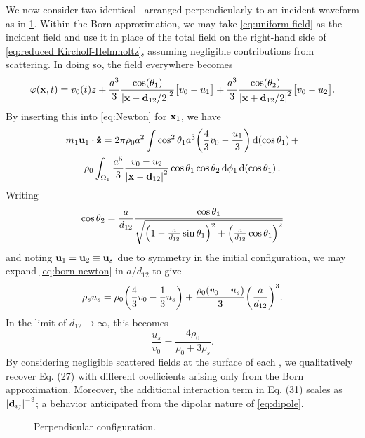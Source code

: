 We now consider two identical \bubbles\ arranged perpendicularly to an incident waveform as in \cref{fig:perpendicular}.
Within the Born approximation, we may take \cref{eq:uniform field} as the incident field and use it in place of the total field on the right-hand side of \cref{eq:reduced Kirchoff-Helmholtz}, assuming negligible contributions from scattering. In doing so, the field everywhere becomes
\begin{equation}
  \varphi(\vb{x}, t) = v_0(t) z + \frac{a^3}{3} \frac{\cos(\theta_1)}{\abs{\vb{x} - \vb{d}_{12}/2}^2}\qty\big[v_0 - u_1]
                                + \frac{a^3}{3} \frac{\cos(\theta_2)}{\abs{\vb{x} + \vb{d}_{12}/2}^2}\qty\big[v_0 - u_2].
\end{equation}
By inserting this into \cref{eq:Newton} for $\vb{x}_1$, we have
\begin{equation}
  \label{eq:born newton}
  \begin{gathered}
  m_1 \vb{u}_1 \cdot \vu{z} = 2 \pi \rho_0 a^2 \int \cos^2\theta_1 a^3 \qty(\frac{4}{3}v_0 - \frac{u_1}{3}) \dd{\qty(\cos\theta_1)} + \\
    \rho_0 \int_{\Omega_1} \frac{a^5}{3} \frac{v_0 - u_2}{\abs{\vb{x} - \vb{d}_{12}}^2} \cos\theta_1 \cos\theta_2 \dd{\phi_1} \dd{\qty(\cos \theta_1)}.
  \end{gathered}
\end{equation}
Writing
\begin{equation}
  \cos\theta_2 = \frac{a}{d_{12}} \frac{\cos\theta_1}{\sqrt{\qty(1 - \frac{a}{d_{12}}\sin\theta_1)^2 + \qty(\frac{a}{d_{12}}\cos\theta_1)^2}}
\end{equation}
and noting $\vb{u}_1 = \vb{u}_2 \equiv \vb{u}_s$ due to symmetry in the initial configuration, we may expand \cref{eq:born newton} in $a/d_{12}$ to give
\begin{equation}
  \label{eq:two bubble born}
  \rho_s u_s = \rho_0\qty(\frac{4}{3}v_0 - \frac{1}{3}u_s) + \frac{\rho_0\qty(v_0 - u_s)}{3}\qty(\frac{a}{d_{12}})^3.
\end{equation}
In the limit of $d_{12} \to \infty$, this becomes
\begin{equation}
  \frac{u_s}{v_0} = \frac{4 \rho_0}{\rho_0 + 3\rho_s}.
\end{equation}
By considering negligible scattered fields at the surface of each \bubble, we qualitatively recover Eq. (27) with different coefficients arising only from the Born approximation.
Moreover, the additional interaction term in Eq. (31) scales as $\abs{\vb{d}_{ij}}^{-3}$; a behavior anticipated from the dipolar nature of \cref{eq:dipole}.

\begin{figure}
  \centering
  
  \caption{\label{fig:perpendicular}Perpendicular configuration.}
\end{figure}

